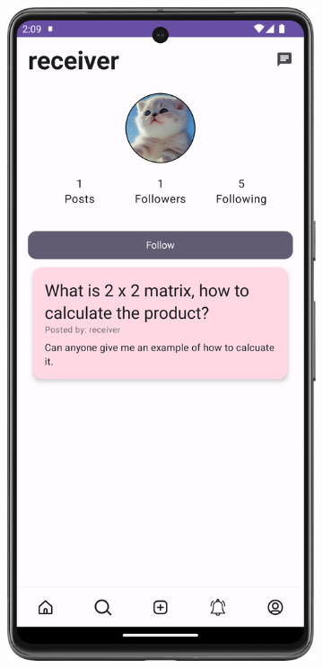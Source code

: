 \begin{figure}[H]
  \begin{subfigure}[b]{0.3\textwidth}
    \includegraphics[width=\textwidth]{Figures/Product_Images/Auth/search_follow_user.png}

\end{subfigure}
\end{figure}
